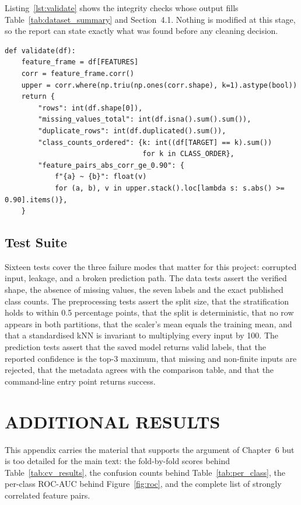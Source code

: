 Listing~\ref{lst:validate} shows the integrity checks whose output fills
Table~\ref{tab:dataset_summary} and Section~4.1. Nothing is modified at this
stage, so the report can state exactly what was found before any cleaning
decision.

\begin{lstlisting}[style=pycode, caption={Validation reports facts; it never
cleans.}, label={lst:validate}]
def validate(df):
    feature_frame = df[FEATURES]
    corr = feature_frame.corr()
    upper = corr.where(np.triu(np.ones(corr.shape), k=1).astype(bool))
    return {
        "rows": int(df.shape[0]),
        "missing_values_total": int(df.isna().sum().sum()),
        "duplicate_rows": int(df.duplicated().sum()),
        "class_counts_ordered": {k: int((df[TARGET] == k).sum())
                                 for k in CLASS_ORDER},
        "feature_pairs_abs_corr_ge_0.90": {
            f"{a} ~ {b}": float(v)
            for (a, b), v in upper.stack().loc[lambda s: s.abs() >= 0.90].items()},
    }
\end{lstlisting}

\section{Test Suite}

Sixteen tests cover the three failure modes that matter for this project:
corrupted input, leakage, and a broken prediction path. The data tests assert the
verified shape, the absence of missing values, the seven labels and the exact
published class counts. The preprocessing tests assert the split size, that the
stratification holds to within 0.5 percentage points, that the split is
deterministic, that no row appears in both partitions, that the scaler's mean
equals the training mean, and that a standardised kNN is invariant to multiplying
every input by 100. The prediction tests assert that the saved model returns valid
labels, that the reported confidence is the top-3 maximum, that missing and
non-finite inputs are rejected, that the metadata agrees with the comparison table,
and that the command-line entry point returns success.

\chapter{ADDITIONAL RESULTS}

This appendix carries the material that supports the argument of Chapter~6 but is
too detailed for the main text: the fold-by-fold scores behind
Table~\ref{tab:cv_results}, the confusion counts behind
Table~\ref{tab:per_class}, the per-class ROC-AUC behind Figure~\ref{fig:roc}, and
the complete list of strongly correlated feature pairs.

